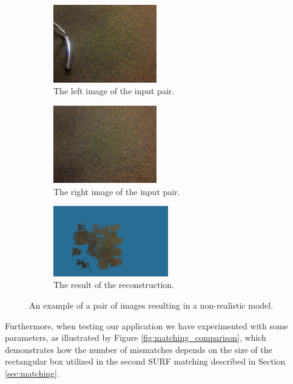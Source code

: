 \begin{figure}[h]
\centering

\begin{subfigure}[b]{0.45\textwidth}
\centering
\includegraphics[width=4.5cm]{img/bad_input1.png}
\caption{The left image of the input pair.} \label{x0}
\end{subfigure}
\begin{subfigure}[b]{0.45\textwidth}
\centering
\includegraphics[width=4.5cm]{img/bad_input2}
\caption{The right image of the input pair.} \label{x2}
\end{subfigure}
\begin{subfigure}[b]{0.45\textwidth}
\centering
\includegraphics[width=5.0cm]{img/bad_result.png}
\caption{The result of the reconstruction.} \label{x3}
\end{subfigure}
\caption[]{An example of a pair of images resulting in a non-realistic model.} 
\label{fig:bad_example}
\end{figure}
Furthermore, when testing our application we have experimented with some parameters, as illustrated by Figure \ref{fig:matching_comparison}, which demonstrates how the number of mismatches depends on the size of the rectangular box utilized in the second SURF matching described in Section \ref{sec:matching}.
